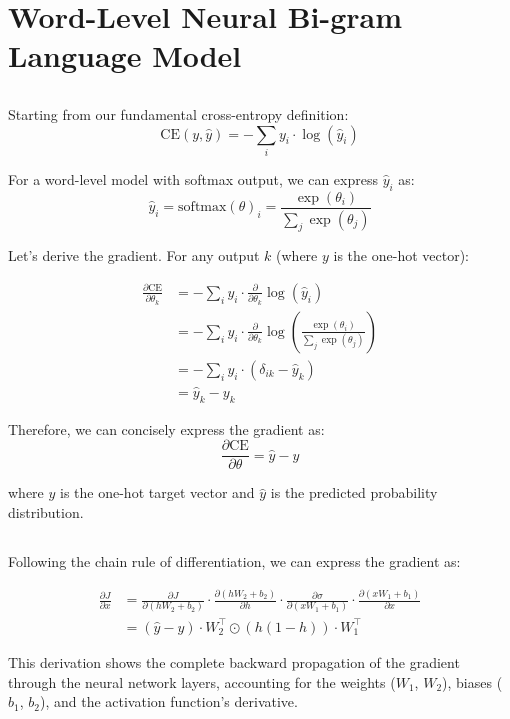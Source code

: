 \documentclass{article}
\begin{document}
\section{Word-Level Neural Bi-gram Language Model}
\subsection{}
\noindent
Starting from our fundamental cross-entropy definition:
\[ \text{CE}(y, \hat{y}) = -\sum_i y_i \cdot \log(\hat{y}_i) \]

\noindent
For a word-level model with softmax output, we can express $\hat{y}_i$ as:
\[ \hat{y}_i = \text{softmax}(\theta)_i = \frac{\exp(\theta_i)}{\sum_j \exp(\theta_j)} \]

\noindent
Let's derive the gradient. For any output $k$ (where $y$ is the one-hot vector):

\begin{align}
\frac{\partial \text{CE}}{\partial \theta_k} &= 
-\sum_i y_i \cdot \frac{\partial}{\partial \theta_k} \log(\hat{y}_i) \\[1em]
&= -\sum_i y_i \cdot \frac{\partial}{\partial \theta_k} \log\left(\frac{\exp(\theta_i)}{\sum_j \exp(\theta_j)}\right) \\[1em]
&= -\sum_i y_i \cdot \left(\delta_{ik} - \hat{y}_k\right) \\[1em]
&= \hat{y}_k - y_k
\end{align}

\noindent
Therefore, we can concisely express the gradient as:
\[ \frac{\partial \text{CE}}{\partial \theta} = \hat{y} - y \]

\noindent
where $y$ is the one-hot target vector and $\hat{y}$ is the predicted probability distribution.
\subsection{}

\noindent
Following the chain rule of differentiation, we can express the gradient as:

\begin{align*}
\frac{\partial J}{\partial x} &= \frac{\partial J}{\partial(hW_2 + b_2)} \cdot \frac{\partial(hW_2 + b_2)}{\partial h} \cdot \frac{\partial \sigma}{\partial(xW_1 + b_1)} \cdot \frac{\partial(xW_1 + b_1)}{\partial x} \\[1em]
&= (\hat{y} - y) \cdot W_2^\top \odot (h(1-h)) \cdot W_1^\top
\end{align*}

\noindent
This derivation shows the complete backward propagation of the gradient through the neural network layers, accounting for the weights ($W_1$, $W_2$), biases ($b_1$, $b_2$), and the activation function's derivative.
\end{document}

